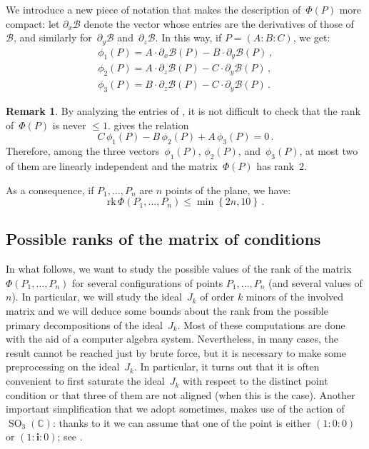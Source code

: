 \documentclass{amsart}
\theoremstyle{plain}
\theoremstyle{definition}
\newtheorem{rmk}[lemma]{Remark}
\newcommand{\C}{\mathbb{C}}
\newcommand{\de}{\partial}
\newcommand{\SO}{\operatorname{SO}}
\newcommand{\iii}{\textbf{i}}
\newcommand{\rk}{\ensuremath{\mathrm{rk}}}
\begin{document}
We introduce a new piece of notation that makes the description of~$\Phi(P)$ more compact: let $\de_x \mathcal{B}$ denote the vector whose entries are the derivatives of those of~$\mathcal{B}$, and similarly for~$\de_y \mathcal{B}$ and~$\de_z \mathcal{B}$.
In this way, if $P=(A: B: C)$, we get:
%
\begin{equation}
\label{equation:vector_conditions}
  \begin{gathered}
    \phi_1(P) = A\cdot \de_x \mathcal{B}(P) - B\cdot \de_y \mathcal{B}(P) \,, \\
    \phi_2(P) = A\cdot \de_z \mathcal{B}(P) - C\cdot \de_y \mathcal{B}(P) \,, \\
    \phi_3(P) = B\cdot \de_z \mathcal{B}(P) - C\cdot \de_y \mathcal{B}(P) \,.
  \end{gathered}
\end{equation}
%
\begin{rmk}
By analyzing the entries of , it is not difficult to check that the rank of~$\Phi(P)$ is never $\leq 1$.  gives the relation
%
\begin{equation}
\label{eq:base}
  C \, \phi_1(P) - B \, \phi_2(P) + A \, \phi_3(P) = 0 \,.
\end{equation}
%
Therefore,
among the three vectors~$\phi_1(P)$, $\phi_2(P)$, and~$\phi_3(P)$, at most two of them are linearly independent and the matrix~$\Phi(P)$ has rank~$2$.

As a consequence, if $P_1, \dots, P_n$ are $n$ points of the plane, we have:
%
\begin{equation}
\label{eq:bound_rank}
  \rk \,\Phi(P_1, \dots, P_n) \leq \min \left\{2n, 10 \right\} \,.
\end{equation}
%
\end{rmk}

\subsection{Possible ranks of the matrix of conditions}

In what follows, we want to study the possible values of the rank of the matrix
$\Phi(P_1, \dots, P_n)$ for several configurations of points $P_1, \dots, P_n$
(and several values of $n$).
In particular, we will study the ideal~$J_k$ of order $k$ minors of the
involved matrix and we will deduce some bounds about the rank from the possible primary
decompositions of the ideal~$J_k$. Most of these computations are done
with the aid of a computer algebra system. Nevertheless, in many cases,
the result cannot be reached just by brute force, but it is necessary to
make some preprocessing on the ideal~$J_k$. In particular, it turns out that
it is often convenient to first saturate the ideal~$J_k$ with respect to
the distinct point condition or that three of them are not aligned (when this is the
case). Another important simplification that we adopt sometimes, makes use
of the action of~$\SO_3(\C)$: thanks to it we can assume that one of
the point is either $(1: 0: 0)$ or $(1: \iii: 0)$; see .
\end{document}

